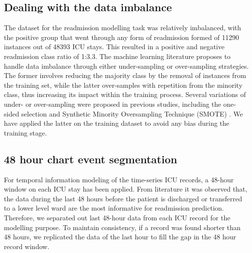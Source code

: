 \documentclass[letterpaper, 10pt, conference]{ieeeconf} %
\begin{document}
\subsection{Dealing with the data imbalance}
The dataset for the readmission modelling task was relatively imbalanced, with the positive group that went through any form of readmission formed of 11290 instances out of 48393 ICU stays. This resulted in a positive and negative readmission class ratio of 1:3.3.  The machine learning literature proposes to handle data imbalance through either under-sampling or over-sampling strategies. The former involves reducing the majority class by the removal of instances from the training set, while the latter over-samples with repetition from the minority class, thus increasing its impact within the training process. Several variations of under- or over-sampling were proposed in previous studies, including the one-sided selection and Synthetic Minority Oversampling Technique (SMOTE) \cite{witten2016data}. We have applied the latter on the training dataset to avoid any bias during the training stage.

\subsection{ 48 hour chart event segmentation}

For temporal information modeling of the time-series ICU records, a 48-hour window on each ICU stay has been applied. From literature it was observed that, the data during the last 48 hours before the patient is discharged or transferred to a lower level ward are the most informative for readmission 
prediction. Therefore, we separated out last 48-hour data from each ICU record for the modelling purpose. To maintain consistency, if a record was found shorter than 48 hours, we replicated the data of the last hour to fill the gap in the 48 hour record window. 






\end{document}

